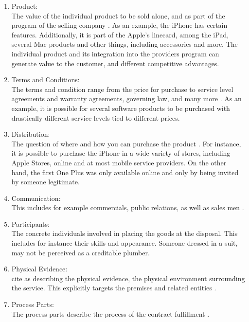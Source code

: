 \begin{enumerate}
    \item{Product:}\\
    The value of the individual product to be sold alone, and as part of the program of the selling company \parencite[cf.][398]{Meffert.2015}. As an example, the iPhone has certain features. Additionally, it is part of the Apple's linecard, among the iPad, several Mac products and other things, including accessories and more. The individual product and its integration into the providers program can generate value to the customer, and different competitive advantages.
    
    \item{Terms and Conditions:}\\
    The terms and condition range from the price for purchase to service level agreements and warranty agreements, governing law, and many more \parencite{Hoepner2015}. As an example, it is possible for several software products to be purchased with drastically different service levels tied to different prices. 
    
    \item{Distribution:}\\
    The question of where and how you can purchase the product \parencite{Hoepner2015}. For instance, it is possible to purchase the iPhone in a wide variety of stores, including Apple Stores, online and at most mobile service providers. On the other hand, the first One Plus was only available online and only by being invited by someone legitimate.
    
    \item{Communication:}\\
    This includes for example commercials, public relations, as well as sales men \parencite{Hoepner2015}.
    
    \item{Participants:}\\
    The concrete individuals involved in placing the goods at the disposal. This includes for instance their skills and appearance. Someone dressed in a suit, may not be perceived as a creditable plumber\parencite{Hoepner2015}. 
    
    \item{Physical Evidence:}\\
    \textcite[155]{AzilaGbettor2013} cite \textcite{Booms.1981} as describing the physical evidence, the physical environment surrounding the service. This explicitly targets the premises and related entities \parencite[cf.]{Hoepner2015}.
    
    \item{Process Parts:}\\
    The process parts describe the process of the contract fulfillment \parencite{Hoepner2015}.
\end{enumerate}


